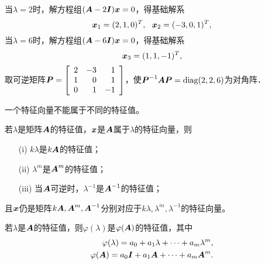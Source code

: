 \begin{frame}
  当$\lambda=2$时，解方程组$(\boldsymbol{A}-2\boldsymbol{I}){\boldsymbol{x}}=0$，得基础解系
  $$
  {\boldsymbol{x}}_1=(2,1,0)^T, ~~ {\boldsymbol{x}}_2=(-3,0,1)^T,
  $$
  当$\lambda=6$时，解方程组$(\boldsymbol{A}-6\boldsymbol{I}){\boldsymbol{x}}=0$，得基础解系
  $$
  {\boldsymbol{x}}_3=(1,1,-1)^T,
  $$
  取可逆矩阵$\boldsymbol{P}=\left[
      \begin{array}{rrr}
        2&-3&1\\
        1&0&1\\
        0&1&-1
      \end{array}\right]
    $，使$\boldsymbol{P}^{-1}\boldsymbol{A}\boldsymbol{P}=\mathrm{diag}(2,2,6)$为对角阵．
\end{frame}

\begin{frame}[fragile]

\begin{dingli}
  一个特征向量不能属于不同的特征值。
\end{dingli}

\end{frame}

\begin{frame}[fragile]



\begin{xingzhi}
  若$\lambda$是矩阵$\boldsymbol{A}$的特征值，${\boldsymbol{x}}$是$\boldsymbol{A}$属于$\lambda$的特征向量，则
  \begin{itemize}
  \item[(i)] $k\lambda$是$k\boldsymbol{A}$的特征值；
  \item[(ii)] $\lambda^m$是$\boldsymbol{A}^m$的特征值；
  \item[(iii)] 当$\boldsymbol{A}$可逆时，$\lambda^{-1}$是$\boldsymbol{A}^{-1}$的特征值；
  \end{itemize}
  且${\boldsymbol{x}}$仍是矩阵$k\boldsymbol{A},\boldsymbol{A}^m,\boldsymbol{A}^{-1}$分别对应于$k\lambda,\lambda^m,\lambda^{-1}$的特征向量。
\end{xingzhi}
\end{frame}


\begin{frame}[fragile]

\begin{zhu*}
  若$\lambda$是$\boldsymbol{A}$的特征值，则$\varphi(\lambda)$是$\varphi(\boldsymbol{A})$的特征值，其中
  $$
  \begin{aligned}
    \varphi(\lambda)=a_0+a_1\lambda+\cdots+a_m\lambda^m,\\
    \varphi(\boldsymbol{A})=a_0\boldsymbol{I}+a_1\boldsymbol{A}+\cdots+a_m\boldsymbol{A}^m.
  \end{aligned}
  $$
\end{zhu*}
\end{frame}

